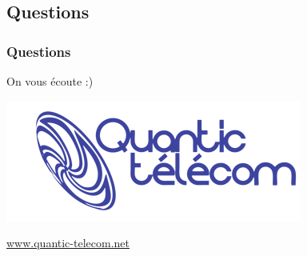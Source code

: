 \documentclass[handout]{beamer}
\newif\ifplacelogo %
\begin{document}
	\placelogofalse 
	\subsection{Questions}
		\begin{frame}
		\frametitle{Questions}
		\huge{On vous écoute :)}
		\begin{center}
			\includegraphics[height=.3\textheight]{images/logo.png}
		\end{center}
		\begin{center}
			\small{\underline{www.quantic-telecom.net}}
		\end{center}
		\end{frame}


\end{document}
